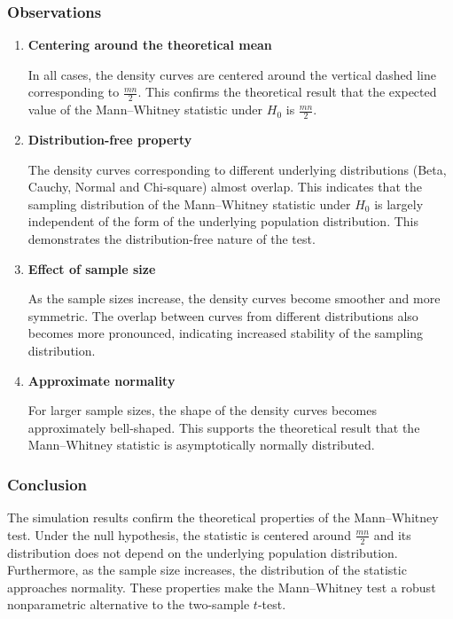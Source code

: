 \documentclass[10pt]{article}
\begin{document}
\subsubsection*{Observations}

\begin{enumerate}

\item \textbf{Centering around the theoretical mean}

In all cases, the density curves are centered around the vertical dashed
line corresponding to $\frac{mn}{2}$. This confirms the theoretical
result that the expected value of the Mann--Whitney statistic under
$H_0$ is $\frac{mn}{2}$.

\item \textbf{Distribution-free property}

The density curves corresponding to different underlying distributions
(Beta, Cauchy, Normal and Chi-square) almost overlap. This indicates
that the sampling distribution of the Mann--Whitney statistic under
$H_0$ is largely independent of the form of the underlying population
distribution. This demonstrates the distribution-free nature of the
test.

\item \textbf{Effect of sample size}

As the sample sizes increase, the density curves become smoother and
more symmetric. The overlap between curves from different distributions
also becomes more pronounced, indicating increased stability of the
sampling distribution.

\item \textbf{Approximate normality}

For larger sample sizes, the shape of the density curves becomes
approximately bell-shaped. This supports the theoretical result that
the Mann--Whitney statistic is asymptotically normally distributed.

\end{enumerate}

\subsubsection*{Conclusion}

The simulation results confirm the theoretical properties of the
Mann--Whitney test. Under the null hypothesis, the statistic is centered
around $\frac{mn}{2}$ and its distribution does not depend on the
underlying population distribution. Furthermore, as the sample size
increases, the distribution of the statistic approaches normality.
These properties make the Mann--Whitney test a robust nonparametric
alternative to the two-sample $t$-test.
\end{document}
